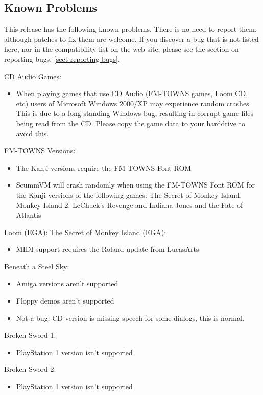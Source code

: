 \subsection{Known Problems}

This release has the following known problems. There is no need to report them,
although patches to fix them are welcome. If you discover a bug that is not
listed here, nor in the compatibility list on the web site, please see
the section on reporting bugs. \ref{sect-reporting-bugs}.

CD Audio Games:
  \begin{itemize}
  \item When playing games that use CD Audio (FM-TOWNS games, Loom CD, etc)
            users of Microsoft Windows 2000/XP may experience random crashes.
            This is due to a long-standing Windows bug, resulting in corrupt
            game files being read from the CD. Please copy the game data to
            your harddrive to avoid this.
  \end{itemize}
FM-TOWNS Versions:
  \begin{itemize}
  \item The Kanji versions require the FM-TOWNS Font ROM
  \item ScummVM will crash randomly when using the FM-TOWNS Font ROM for
            the Kanji versions of the following games:
            The Secret of Monkey Island, Monkey Island 2: LeChuck's Revenge
            and Indiana Jones and the Fate of Atlantis
  \end{itemize}
Loom (EGA):
The Secret of Monkey Island (EGA):
  \begin{itemize}
  \item MIDI support requires the Roland update from LucasArts
  \end{itemize}
Beneath a Steel Sky:
  \begin{itemize}
  \item Amiga versions aren't supported
  \item Floppy demos aren't supported
  \item Not a bug: CD version is missing speech for some dialogs, this is
            normal.
  \end{itemize}
Broken Sword 1:
  \begin{itemize}
  \item PlayStation 1 version isn't supported
  \end{itemize}
Broken Sword 2:
  \begin{itemize}
  \item PlayStation 1 version isn't supported
  \end{itemize}
